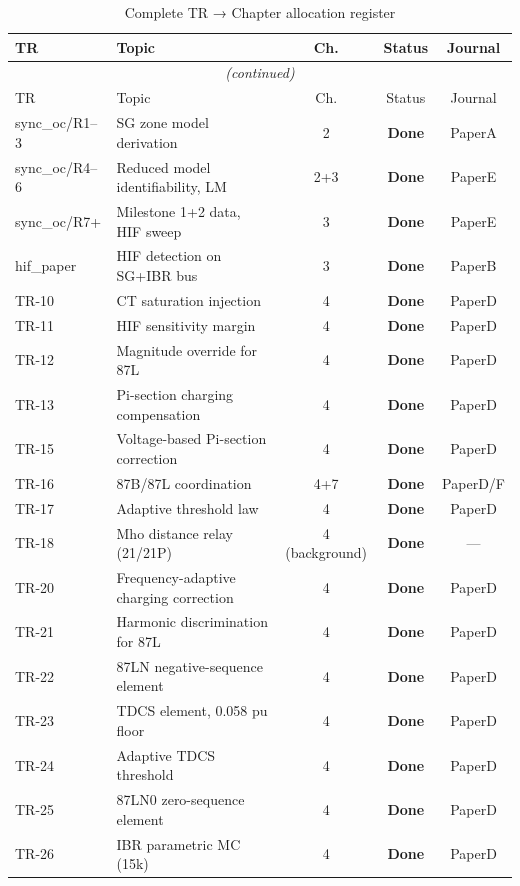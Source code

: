 \documentclass[11pt, a4paper]{article}
\newcommand{\done}[1]{\textcolor{donecol}{\textbf{#1}}}
\begin{document}
\begin{longtable}{lp{6.5cm}ccc}
\caption{Complete TR → Chapter allocation register}\label{tab:alloc}\\
\toprule
TR & Topic & Ch. & Status & Journal \\
\midrule
\endfirsthead
\multicolumn{5}{c}{\textit{(continued)}}\\
\toprule
TR & Topic & Ch. & Status & Journal \\
\midrule
\endhead
\bottomrule
\endfoot
sync\_oc/R1--3 & SG zone model derivation & 2 & \done{Done} & PaperA \\
sync\_oc/R4--6 & Reduced model identifiability, LM & 2+3 & \done{Done} & PaperE \\
sync\_oc/R7+ & Milestone 1+2 data, HIF sweep & 3 & \done{Done} & PaperE \\
hif\_paper & HIF detection on SG+IBR bus & 3 & \done{Done} & PaperB \\
TR-10 & CT saturation injection & 4 & \done{Done} & PaperD \\
TR-11 & HIF sensitivity margin & 4 & \done{Done} & PaperD \\
TR-12 & Magnitude override for 87L & 4 & \done{Done} & PaperD \\
TR-13 & Pi-section charging compensation & 4 & \done{Done} & PaperD \\
TR-15 & Voltage-based Pi-section correction & 4 & \done{Done} & PaperD \\
TR-16 & 87B/87L coordination & 4+7 & \done{Done} & PaperD/F \\
TR-17 & Adaptive threshold law & 4 & \done{Done} & PaperD \\
TR-18 & Mho distance relay (21/21P) & 4 (background) & \done{Done} & --- \\
TR-20 & Frequency-adaptive charging correction & 4 & \done{Done} & PaperD \\
TR-21 & Harmonic discrimination for 87L & 4 & \done{Done} & PaperD \\
TR-22 & 87LN negative-sequence element & 4 & \done{Done} & PaperD \\
TR-23 & TDCS element, 0.058 pu floor & 4 & \done{Done} & PaperD \\
TR-24 & Adaptive TDCS threshold & 4 & \done{Done} & PaperD \\
TR-25 & 87LN0 zero-sequence element & 4 & \done{Done} & PaperD \\
TR-26 & IBR parametric MC (15k) & 4 & \done{Done} & PaperD \\

\end{longtable}
\end{document}
